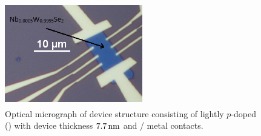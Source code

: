 \begin{figure}[ht]
	\centering
	\includegraphics[height=4.5cm,width=6.0cm]{figs/results/hall_bar_doped_channel/hall_bar_device_pic_11192015_no2_doping_scheme}
	\caption[Hall bar device optical micrograph using \lightlyfive]{Optical micrograph of device structure consisting of lightly $p$-doped  (\lightlyfive) with device thickness $7.7\,\mathrm{nm}$ and / metal contacts.}
	\label{fig:hall_bar_device1}
\end{figure}

